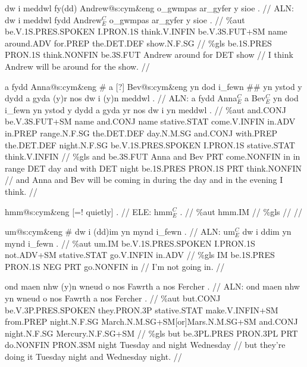\documentclass[a4paper,10pt]{article}
\begin{document}
\ex
\begingl[lingstyle=gergl]
\glchat dw i meddwl fy(dd) Andrew@s:cym\&eng o\_gwmpas ar\_gyfer y sioe . //
\glsurface ALN:  dw i meddwl fydd Andrew$^{C}_{E}$ o\_gwmpas ar\_gyfer y sioe .  //
\glauto \%aut  be{\scriptsize .V.1S.PRES.SPOKEN} I{\scriptsize .PRON.1S} think{\scriptsize .V.INFIN} be{\scriptsize .V.3S.FUT+SM} name around{\scriptsize .ADV} for{\scriptsize .PREP} the{\scriptsize .DET.DEF} show{\scriptsize .N.F.SG}   //
\glmanual \%gls  be{\scriptsize .1S.PRES} PRON{\scriptsize .1S} think{\scriptsize .NONFIN} be{\scriptsize .3S.FUT} Andrew around for DET show   //
\gleng I think Andrew will be around for the show. //
\endgl
\xe

\ex
\begingl[lingstyle=gergl]
\glchat a fydd Anna@s:cym\&eng \# a [?] Bev@s:cym\&eng yn dod i\_fewn \#\# yn ystod y dydd a gyda (y)r nos dw i (y)n meddwl . //
\glsurface ALN:  a fydd Anna$^{C}_{E}$ a Bev$^{C}_{E}$ yn dod i\_fewn yn ystod y dydd a gyda yr nos dw i yn meddwl .  //
\glauto \%aut  and{\scriptsize .CONJ} be{\scriptsize .V.3S.FUT+SM} name and{\scriptsize .CONJ} name stative{\scriptsize .STAT} come{\scriptsize .V.INFIN} in{\scriptsize .ADV} in{\scriptsize .PREP} range{\scriptsize .N.F.SG} the{\scriptsize .DET.DEF} day{\scriptsize .N.M.SG} and{\scriptsize .CONJ} with{\scriptsize .PREP} the{\scriptsize .DET.DEF} night{\scriptsize .N.F.SG} be{\scriptsize .V.1S.PRES.SPOKEN} I{\scriptsize .PRON.1S} stative{\scriptsize .STAT} think{\scriptsize .V.INFIN}   //
\glmanual \%gls  and be{\scriptsize .3S.FUT} Anna and Bev PRT come{\scriptsize .NONFIN} in in range DET day and with DET night be{\scriptsize .1S.PRES} PRON{\scriptsize .1S} PRT think{\scriptsize .NONFIN}   //
\gleng and Anna and Bev will be coming in during the day and in the evening I think. //
\endgl
\xe

\ex
\begingl[lingstyle=gergl]
\glchat hmm@s:cym\&eng [=! quietly] . //
\glsurface ELE:  hmm$^{C}_{E}$ .  //
\glauto \%aut  hmm{\scriptsize .IM}   //
\glmanual \%gls     //
\gleng  //
\endgl
\xe

\ex
\begingl[lingstyle=gergl]
\glchat um@s:cym\&eng \# dw i (dd)im yn mynd i\_fewn . //
\glsurface ALN:  um$^{C}_{E}$ dw i ddim yn mynd i\_fewn .  //
\glauto \%aut  um{\scriptsize .IM} be{\scriptsize .V.1S.PRES.SPOKEN} I{\scriptsize .PRON.1S} not{\scriptsize .ADV+SM} stative{\scriptsize .STAT} go{\scriptsize .V.INFIN} in{\scriptsize .ADV}   //
\glmanual \%gls  IM be{\scriptsize .1S.PRES} PRON{\scriptsize .1S} NEG PRT go{\scriptsize .NONFIN} in   //
\gleng I'm not going in. //
\endgl
\xe

\ex
\begingl[lingstyle=gergl]
\glchat ond maen nhw (y)n wneud o nos Fawrth a nos Fercher . //
\glsurface ALN:  ond maen nhw yn wneud o nos Fawrth a nos Fercher .  //
\glauto \%aut  but{\scriptsize .CONJ} be{\scriptsize .V.3P.PRES.SPOKEN} they{\scriptsize .PRON.3P} stative{\scriptsize .STAT} make{\scriptsize .V.INFIN+SM} from{\scriptsize .PREP} night{\scriptsize .N.F.SG} March{\scriptsize .N.M.SG+SM[or]Mars.N.M.SG+SM} and{\scriptsize .CONJ} night{\scriptsize .N.F.SG} Mercury{\scriptsize .N.F.SG+SM}   //
\glmanual \%gls  but be{\scriptsize .3PL.PRES} PRON{\scriptsize .3PL} PRT do{\scriptsize .NONFIN} PRON{\scriptsize .3SM} night Tuesday and night Wednesday   //
\gleng but they're doing it Tuesday night and Wednesday night. //
\endgl
\xe
\end{document}
